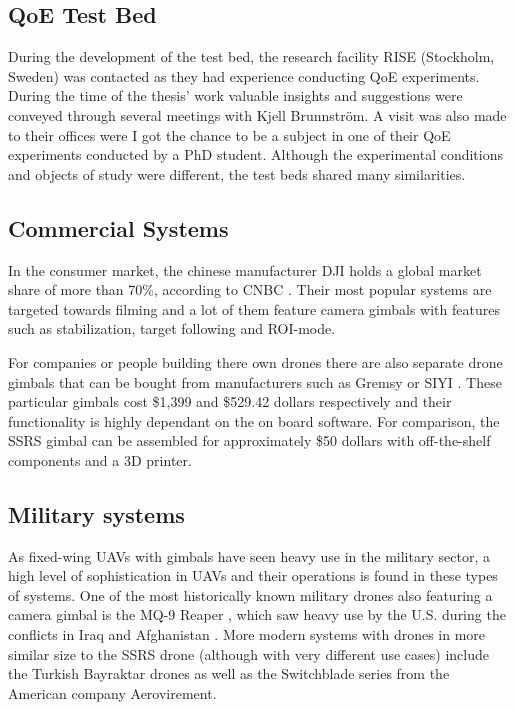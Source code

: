\documentclass[nofilelist]{cslthse-msc}
\begin{document}
\subsection{QoE Test Bed}
During the development of the test bed, the research facility RISE (Stockholm, Sweden) was contacted as they had experience conducting QoE experiments. During the time of the thesis' work valuable insights and suggestions were conveyed through several meetings with Kjell Brunnström. A visit was also made to their offices were I got the chance to be a subject in one of their QoE experiments conducted by a PhD student. Although the experimental conditions and objects of study were different, the test beds shared many similarities. 

\subsection{Commercial Systems}
In the consumer market, the chinese manufacturer DJI holds a global market share of more than 70\%, according to CNBC \cite{dji}. Their most popular systems are targeted towards filming and a lot of them feature camera gimbals with features such as stabilization, target following and ROI-mode. 

For companies or people building there own drones there are also separate drone gimbals that can be bought from manufacturers such as Gremsy \cite{gremsy} or SIYI \cite{siyi}. These particular gimbals cost \$1,399 and \$529.42 dollars respectively and their functionality is highly dependant on the on board software. For comparison, the SSRS gimbal can be assembled for approximately \$50 dollars with off-the-shelf components and a 3D printer.

\subsection{Military systems}
As fixed-wing UAVs with gimbals have seen heavy use in the military sector, a high level of sophistication in UAVs and their operations is found in these types of systems. One of the most historically known military drones also featuring a camera gimbal is the MQ-9 Reaper \cite{mq9reaper}, which saw heavy use by the U.S. during the conflicts in Iraq and Afghanistan \cite{mq9reaper-wiki}. More modern systems with drones in more similar size to the SSRS drone (although with very different use cases) include the Turkish Bayraktar drones \cite{bayraktar-wiki} as well as the Switchblade series \cite{switchblade} from the American company Aerovirement.
\end{document}
